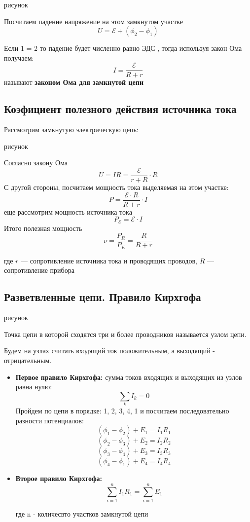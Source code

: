 \documentclass[../main.tex]{subfiles}
\begin{document}
рисунок

Посчитаем падение напряжение на этом замкнутом участке
\[U = \mathscr{E} + (\phi_2 - \phi_1)\]

 Если 1 = 2 то падение будет численно равно ЭДС , тогда используя закон Ома получаем:
\[I = \frac{\mathscr{E}}{R + r}\]
называют \textbf{законом Ома для замкнутой цепи}

\subsection{Коэфициент полезного действия источника тока}
Рассмотрим замкнутую электрическую цепь:

рисунок

Согласно закону Ома 
\[ U = IR = \frac{\mathscr{E}}{r+R} \cdot R \]
С другой стороны, посчитаем мощность тока выделяемая на этом участке:
\[P = \frac{\mathscr{E} \cdot R}{R+r} \cdot I\]
еще рассмотрим мощность источника тока
\[P_{\mathscr{E}} = \mathscr{E} \cdot I\]
Итого полезная мощность
\[\nu = \frac{P_R}{P_E} = \frac{R}{R+r}\]
\begin{center}
    где $r$ --- сопротивление источника тока и проводящих проводов, $R$ --- сопротивление прибора 
\end{center}

\subsection{Разветвленные цепи. Правило Кирхгофа}
рисунок

 Точка цепи в которой сходятся три и более проводников называется узлом цепи.

Будем на узлах считать входящий ток положительным, а выходящий - отрицательным.
\begin{itemize}
    \item \textbf{Первое правило Кирхгофа: } сумма токов входящих и выходящих из узлов равна нулю:
    \[\sum_{k} I_k = 0\]
    Пройдем по цепи в порядке: 1, 2, 3, 4, 1 и посчитаем последовательно разности потенциалов:
    \[(\phi_1 - \phi_2) + E_1 = I_1 R_1\]
    \[(\phi_2 - \phi_3) + E_2 = I_2 R_2\]
    \[(\phi_3 - \phi_4) + E_3 = I_3 R_3\]
    \[(\phi_4 - \phi_1) + E_4 = I_4 R_4\]
    \item \textbf{Второе правило Кирхгофа: }
    \[\sum_{i=1}^{n} I_1 R_1 = \sum_{i = 1}^{n} E_1\]
    \begin{center}
        где n - количесвто участков замкнутой цепи
    \end{center}
\end{itemize}
\end{document}
